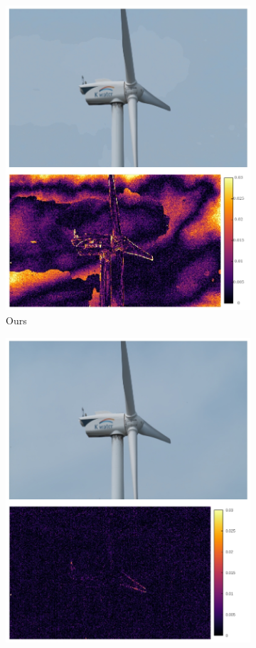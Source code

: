 \documentclass{article}
\begin{document}
\begin{figure}[h]
\begin{subfigure}{0.14\textwidth}
    \includegraphics[width=1\linewidth]{qua_imgs/TEST02_045_f0465_ours.jpg}
    \caption{Ours}
\end{subfigure}%
\begin{subfigure}{0.14\textwidth}
	\centering
    \includegraphics[width=1\linewidth]{qua_imgs/TEST02_045_f0465_abme.jpg}

\end{subfigure}
\end{figure}
\end{document}
